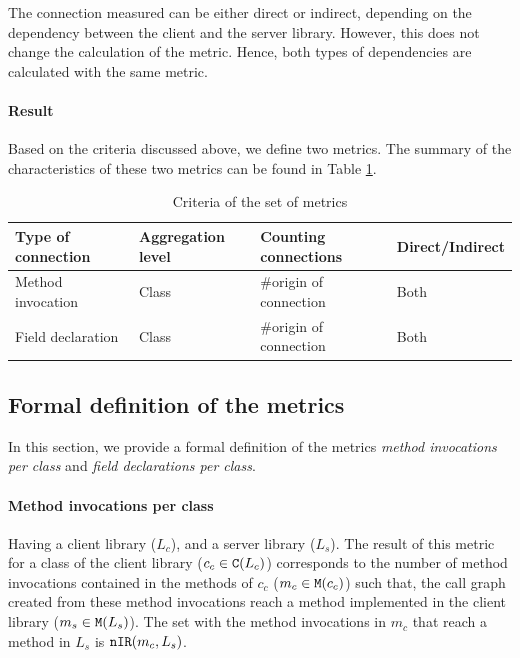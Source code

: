 The connection measured can be either direct or indirect, depending on the dependency between the client and the server library. However, this does not change the calculation of the metric. Hence, both types of dependencies are calculated with the same metric.

\paragraph{Result}
Based on the criteria discussed above, we define two metrics. The summary of the characteristics of these two metrics can be found in Table \ref{table:per-class-characteristics}.

\begin{table}[h]
    \begin{center}
    \begin{tabular}{|l|l|l|l|}
    \hline
    Type of connection & Aggregation level & Counting connections & Direct/Indirect \\ \hline
    Method invocation & Class & \#origin of connection & Both \\
    Field declaration & Class & \#origin of connection & Both \\
    \hline
    \end{tabular}
    \end{center}
    \caption{Criteria of the set of metrics}
    \label{table:per-class-characteristics}
\end{table}

\subsection{Formal definition of the metrics}
In this section, we provide a formal definition of the metrics \textit{method invocations per class} and \textit{field declarations per class}.

\paragraph{Method invocations per class}
Having a client library ($L_c$), and a server library ($L_s$). The result of this metric for a class of the client library ($c_c \in \verb|C|(L_c)$) corresponds to the number of method invocations contained in the methods of $c_c$ ($m_c \in \verb|M|(c_c)$) such that, the call graph created from these method invocations reach a method implemented in the client library ($m_s \in \verb|M|(L_s)$). The set with the method invocations in $m_c$ that reach a method in $L_s$ is $\verb|nIR|(m_c, L_s)$.

